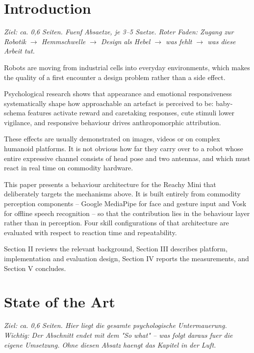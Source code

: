 \documentclass[conference]{IEEEtran}
\begin{document}
\section{Introduction}
\color{structure}\textit{Ziel: ca. 0,6 Seiten. Fuenf Absaetze, je 3--5 Saetze. Roter Faden: Zugang zur Robotik $\rightarrow$ Hemmschwelle $\rightarrow$ Design als Hebel $\rightarrow$ was fehlt $\rightarrow$ was diese Arbeit tut.}\color{black}

 Robots are moving from industrial cells into everyday
environments, which makes the quality of a first encounter a design problem
rather than a side effect.

 Psychological research shows that appearance and
emotional responsiveness systematically shape how approachable an artefact is
perceived to be: baby-schema features activate reward and caretaking
responses, cute stimuli lower
vigilance, and responsive behaviour drives anthropomorphic
attribution.

 These effects are usually demonstrated on images,
videos or on complex humanoid platforms. It is not obvious how far they carry over to a robot whose entire
expressive channel consists of head pose and two antennas, and which must
react in real time on commodity hardware.

 This paper presents a
behaviour architecture for the Reachy Mini that deliberately targets the
mechanisms above. It is built entirely from commodity perception components --
Google MediaPipe for face and gesture input and Vosk for offline speech
recognition -- so that the contribution lies in the behaviour layer rather than
in perception. Four skill configurations of that architecture are evaluated
with respect to reaction time and repeatability.

 Section II reviews the relevant background, Section
III describes platform, implementation and evaluation design, Section IV
reports the measurements, and Section V concludes.

\section{State of the Art}
\color{structure}\textit{Ziel: ca. 0,6 Seiten. Hier liegt die gesamte
psychologische Untermauerung. Wichtig: Der Abschnitt endet mit dem
"So what" -- was folgt daraus fuer die eigene Umsetzung. Ohne diesen Absatz
haengt das Kapitel in der Luft.}\color{black}
\end{document}
